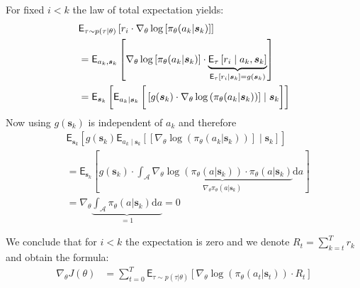 \documentclass[a4paper,12pt, oneside, twocolumn]{scrartcl}
\begin{document}
For fixed $i<k$ the law of total expectation yields:
%
%
\begin{align*}
    &\mathsf{E}_{\tau \sim p(\tau|\theta)}
    \left[
        r_i 
        \cdot 
        \nabla_{\theta} 
        \log
        \left[
            \pi_{\theta}(a_k|\bm{s}_k)
        \right]
    \right]
    \\
    &=
    \mathsf{E}_{a_k, \bm{s}_k}
    \left[
        \nabla_{\theta} \log
        \left[
            \pi_{\theta}(a_k|\bm{s}_k)
        \right]
        \cdot
        \underbrace{
            \mathsf{E}_{\tau}
            \left[
                r_i 
                \mid a_k, \bm{s}_k
            \right]
        }_{
            \mathsf{E}_{\tau}[r_i \mid \bm{s}_k] = g(\bm{s}_k)
        }
    \right]
    \\
    &=
    \mathsf{E}_{\bm{s}_k}
    \left[
        \mathsf{E}_{a_k \mid \bm{s}_k}
        \left[
            \vphantom{\int}
            \left[ 
                g(\bm{s}_k)
                \cdot 
                \nabla_{\theta} \log\left( \pi_{\theta}(a_k|\bm{s}_k) \right) 
            \right]
            \mid \bm{s}_k
        \right]
    \right]
\end{align*}
%
Now using $g(\bm{s}_k)$ is independent of $a_k$ and therefore
%
\small{
    \begin{align*}
        &
        \mathsf{E}_{\bm{s}_k}
        \left[
            g(\bm{s}_k)
            \mathsf{E}_{a_k \mid \bm{s}_k}
            \left[
                \left[ 
                    \nabla_{\theta} \log\left( \pi_{\theta}(a_k|\bm{s}_k) \right) 
                \right]
                \mid \bm{s}_k
            \right]
        \right]
        \\
        &=
        \mathsf{E}_{\bm{s}_k}
        \left[
            g(\bm{s}_k)
            \cdot
            \int_{\mathcal{A}} 
            \underbrace{
                \nabla_{\theta} 
                \log
                \left( 
                    \pi_{\theta}( a |\bm{s}_k) 
                \right) 
                \cdot 
                \pi_{\theta}(a |\bm{s}_k) 
            }_{
                \nabla_{\theta} \pi_{\theta}(a|\bm{s}_k)
            }
            \mathrm{d}a
        \right]
        \\
        &=
        \nabla_{\theta} 
        \underbrace{
            \int_{\mathcal{A}} \pi_{\theta}(a|\bm{s}_k) \mathrm{d}a
        }_{
            =1
        }
        = 0
    \end{align*}
}

We conclude that for $i<k$ the expectation is zero and 
we denote $R_t = \sum_{k=t}^{T} r_k$ 
and obtain the formula:
%
\begin{align*}
    \nabla_{\theta} J(\theta) 
    &=
    \sum_{t=0}^{T} 
    \mathsf{E}_{\tau \sim p(\tau|\theta)}
    \left[
        \nabla_{\theta} 
        \log
        \left( 
            \pi_{\theta}(a_t|\bm{s}_t) 
        \right)
        \cdot
        R_t
    \right]
\end{align*}
\end{document}
